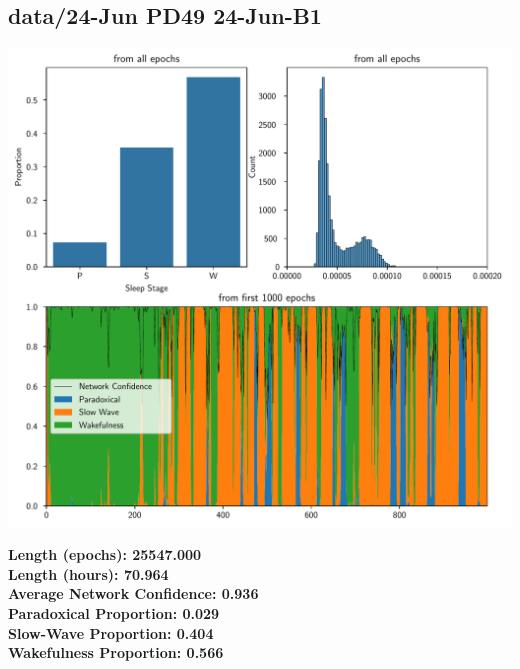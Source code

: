         \subsection*{ data/24-Jun PD49 24-Jun-B1 }
        \begin{center}
        \begin{adjustbox}{width=1\textwidth}
        \includegraphics[page=6]{figs.pdf}
        \end{adjustbox}
        \end{center}
        \large\textbf{Length (epochs): 25547.000}\\
        \textbf{Length (hours): 70.964}\\
        \textbf{Average Network Confidence: 0.936}\\
        \textbf{Paradoxical Proportion: 0.029}\\
        \textbf{Slow-Wave Proportion: 0.404}\\
        \textbf{Wakefulness Proportion: 0.566}\\
        
